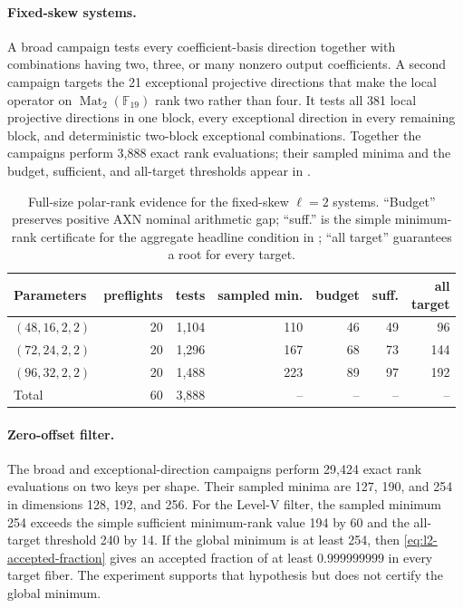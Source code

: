 \documentclass[11pt]{article}
\newcommand{\F}{\mathbb F}
\newcommand{\Mat}{\operatorname{Mat}}
\begin{document}
\paragraph{Fixed-skew systems.}
A broad campaign tests every coefficient-basis direction together with
combinations having two, three, or many nonzero output coefficients.  A second campaign targets
the 21 exceptional projective directions that make the local operator on
$\Mat_2(\F_{19})$ rank two rather than four.  It tests all 381 local
projective directions in one block, every exceptional direction in every
remaining block, and deterministic two-block exceptional combinations.
Together the campaigns perform 3,888 exact rank evaluations; their sampled
minima and the budget, sufficient, and all-target thresholds appear in
.

\begin{table}[tbp]
\centering
\caption{Full-size polar-rank evidence for the fixed-skew $\ell=2$ systems.
``Budget'' preserves positive AXN nominal arithmetic gap; ``suff.'' is the simple
minimum-rank certificate for the aggregate headline condition in
; ``all target'' guarantees a root for every target.}
\label{tab:fixed-skew-evidence}
\small
\setlength{\tabcolsep}{3.3pt}
\begin{tabular}{@{}l r r r r r r@{}}
\toprule
Parameters & preflights & tests & sampled min. & budget & suff. & \shortstack{all\\target}\\
\midrule
$(48,16,2,2)$ & 20 & 1,104 & 110 & 46 & 49 & 96\\
$(72,24,2,2)$ & 20 & 1,296 & 167 & 68 & 73 & 144\\
$(96,32,2,2)$ & 20 & 1,488 & 223 & 89 & 97 & 192\\
\midrule
Total & 60 & 3,888 & -- & -- & -- & --\\
\bottomrule
\end{tabular}
\end{table}

\paragraph{Zero-offset filter.}
The broad and exceptional-direction campaigns perform 29,424 exact rank
evaluations on two keys per shape.  Their sampled minima are 127, 190, and 254
in dimensions 128, 192, and 256.  For the Level-V filter, the sampled minimum
254 exceeds the simple sufficient minimum-rank value 194 by 60 and the
all-target threshold 240 by 14.  If the global minimum is at least 254, then
\eqref{eq:l2-accepted-fraction} gives an accepted fraction of at least
$0.999999999$ in every target fiber.  The experiment supports that hypothesis
but does not certify the global minimum.
\end{document}

